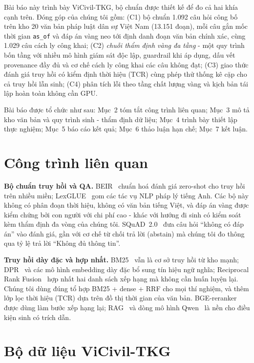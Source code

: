\documentclass[11pt,a4paper]{article}
\begin{document}
Bài báo này trình bày ViCivil-TKG, bộ chuẩn được thiết kế để đo cả hai khía cạnh trên. Đóng góp của chúng tôi gồm: (C1) bộ chuẩn 1.092 câu hỏi công bố trên kho 20 văn bản pháp luật dân sự Việt Nam (13.151 đoạn), mỗi câu gắn mốc thời gian \texttt{as\_of} và đáp án vàng neo tới định danh đoạn văn bản chính xác, cùng 1.029 câu cách ly công khai; (C2) \emph{chuỗi thẩm định vàng đa tầng} - một quy trình bốn tầng với nhiều mô hình giám sát độc lập, guardrail khi áp dụng, dấu vết provenance đầy đủ và cơ chế cách ly công khai các câu không đạt; (C3) giao thức đánh giá truy hồi có kiểm định thời hiệu (TCR) cùng phép thử thống kê cặp cho cả truy hồi lẫn sinh; (C4) phân tích lỗi theo tầng chất lượng vàng và kịch bản tái lập hoàn toàn không cần GPU.

Bài báo được tổ chức như sau: Mục~2 tóm tắt công trình liên quan; Mục~3 mô tả kho văn bản và quy trình sinh - thẩm định dữ liệu; Mục~4 trình bày thiết lập thực nghiệm; Mục~5 báo cáo kết quả; Mục~6 thảo luận hạn chế; Mục~7 kết luận.

\section{Công trình liên quan}

\textbf{Bộ chuẩn truy hồi và QA.} BEIR~\cite{thakur2021beir} chuẩn hoá đánh giá zero-shot cho truy hồi trên nhiều miền; LexGLUE~\cite{chalkidis2022lexglue} gom các tác vụ NLP pháp lý tiếng Anh. Các bộ này không có phân đoạn thời hiệu, không có văn bản tiếng Việt, và đáp án vàng được kiểm chứng bởi con người với chi phí cao - khác với hướng đi sinh có kiểm soát kèm thẩm định đa vòng của chúng tôi. SQuAD~2.0~\cite{rajpurkar2018squad} đưa câu hỏi ``không có đáp án'' vào đánh giá, gần với cơ chế từ chối trả lời (abstain) mà chúng tôi đo thông qua tỷ lệ trả lời ``Không đủ thông tin''.

\textbf{Truy hồi dày đặc và hợp nhất.} BM25~\cite{robertson2009bm25} vẫn là cơ sở truy hồi từ kho mạnh; DPR~\cite{karpukhin2020dpr} và các mô hình embedding dày đặc bổ sung tín hiệu ngữ nghĩa; Reciprocal Rank Fusion~\cite{cormack2009rrf} hợp nhất hai danh sách xếp hạng mà không cần huấn luyện lại. Chúng tôi dùng đúng tổ hợp BM25 + dense + RRF cho mọi thí nghiệm, và thêm lớp lọc thời hiệu (TCR) dựa trên đồ thị thời gian của văn bản. BGE-reranker~\cite{xiao2024cpack} được dùng làm bước xếp hạng lại; RAG~\cite{lewis2020rag} và dòng mô hình Qwen~\cite{yang2024qwen25} là nền cho điều kiện sinh có trích dẫn.

\section{Bộ dữ liệu ViCivil-TKG}
\end{document}

